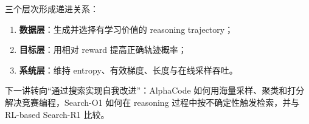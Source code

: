 \documentclass[a4paper]{article}
\begin{document}
三个层次形成递进关系：

\begin{enumerate}
    \item \textbf{数据层}：生成并选择有学习价值的 reasoning trajectory；
    \item \textbf{目标层}：用相对 reward 提高正确轨迹概率；
    \item \textbf{系统层}：维持 entropy、有效梯度、长度与在线采样吞吐。
\end{enumerate}

下一讲转向“通过搜索实现自我改进”：AlphaCode 如何用海量采样、聚类和打分解决竞赛编程，Search-O1 如何在 reasoning 过程中按不确定性触发检索，并与 RL-based Search-R1 比较。
\end{document}
